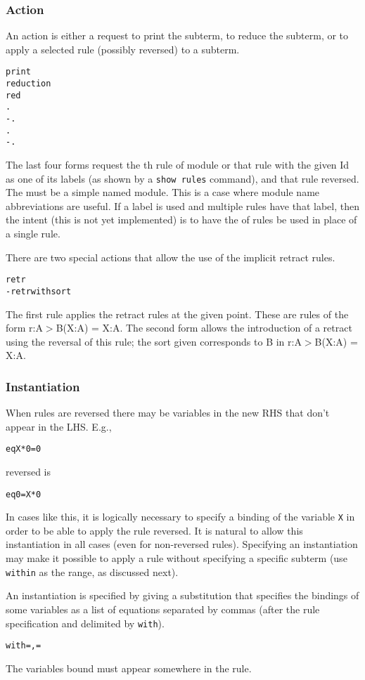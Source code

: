 \subsubsection{Action}
An action is either a request to print the subterm, to reduce the
subterm, or to apply a selected rule (possibly reversed) to a subterm.
\begin{alltt}
        print
        reduction
        red
        .
        -.
        .
        -.
\end{alltt}
The last four forms request the th rule of module 
or that rule with the given Id as one of its labels (as shown by a
{\tt show rules} command), and that rule reversed.  The 
must be a simple named module.  This is a case where module name
abbreviations are useful.  If a label is used and multiple rules have
that label, then the intent (this is not yet implemented) is to have
the of rules be used in place of a single rule.

There are two special actions that allow the use of the implicit
retract rules.
\begin{alltt}
        retr
        -retr with sort 
\end{alltt}
The first rule applies the retract rules at the given point.  These
are rules of the form r:A$>$B(X:A) = X:A.  The second form allows the
introduction of a retract using the reversal of this rule; the sort
given corresponds to B in r:A$>$B(X:A) = X:A.

\subsubsection{Instantiation}
When rules are reversed there may be variables in the new RHS that
don't appear in the LHS.  E.g.,
\begin{alltt}
        eq X * 0 = 0
\end{alltt}
reversed is
\begin{alltt}
        eq 0 = X * 0
\end{alltt}
In cases like this, it is logically necessary to specify a binding of
the variable {\tt X} in order to be able to apply the rule reversed.
It is natural to allow this instantiation in all cases (even for
non-reversed rules).  Specifying an instantiation may make it possible
to apply a rule without specifying a specific subterm (use {\tt
  within} as the range, as discussed next).

An instantiation is specified by giving a substitution that specifies
the bindings of some variables as a list of equations separated by
commas (after the rule specification and delimited by {\tt with}).
\begin{alltt}
        with  =  \lsg,  = \rsg\itr
\end{alltt}
The variables bound must appear somewhere in the rule.

